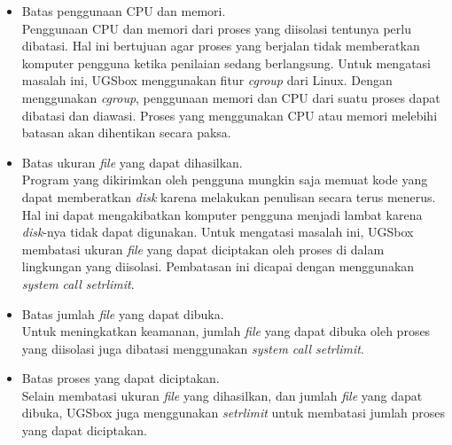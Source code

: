 \begin{itemize}
    \item Batas penggunaan CPU dan memori. \\ Penggunaan CPU dan memori dari proses yang diisolasi tentunya perlu dibatasi. Hal ini bertujuan agar proses yang berjalan tidak memberatkan komputer pengguna ketika penilaian sedang berlangsung. Untuk mengatasi masalah ini, UGSbox menggunakan fitur \textit{cgroup} dari Linux. Dengan menggunakan \textit{cgroup}, penggunaan memori dan CPU dari suatu proses dapat dibatasi dan diawasi. Proses yang menggunakan CPU atau memori melebihi batasan akan dihentikan secara paksa. 

    \item Batas ukuran \textit{file} yang dapat dihasilkan. \\ Program yang dikirimkan oleh pengguna mungkin saja memuat kode yang dapat memberatkan \textit{disk} karena melakukan penulisan secara terus menerus. Hal ini dapat mengakibatkan komputer pengguna menjadi lambat karena \textit{disk}-nya tidak dapat digunakan. Untuk mengatasi masalah ini, UGSbox membatasi ukuran \textit{file} yang dapat diciptakan oleh proses di dalam lingkungan yang diisolasi. Pembatasan ini dicapai dengan menggunakan \textit{system call setrlimit}.

    \item Batas jumlah \textit{file} yang dapat dibuka. \\ Untuk meningkatkan keamanan, jumlah \textit{file} yang dapat dibuka oleh proses yang diisolasi juga dibatasi menggunakan \textit{system call setrlimit}.

    \item Batas proses yang dapat diciptakan. \\ Selain membatasi ukuran \textit{file} yang dihasilkan, dan jumlah \textit{file} yang dapat dibuka, UGSbox juga menggunakan \textit{setrlimit} untuk membatasi jumlah proses yang dapat diciptakan.

\end{itemize}

